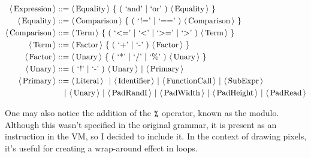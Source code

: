 \begin{align*}
        \langle\, \text{Expression}\, \rangle & ::= \langle\, \text{Equality}\, \rangle \ \{ \ ( \ \text{`and'} \ |\  \text{`or'} \ )\ \langle\, \text{Equality}\, \rangle \ \}                                 \\
        \langle\, \text{Equality}\, \rangle   & ::= \langle\, \text{Comparison}\, \rangle \ \{ \ ( \ \text{`!='} \ |\  \text{`=='} \ )\  \langle\, \text{Comparison}\, \rangle \ \}                             \\
        \langle\, \text{Comparison}\, \rangle & ::= \langle\, \text{Term}\, \rangle \ \{ \ ( \ \text{`<='} \ |\  \text{`<'} \ |\  \text{`>='} \ |\  \text{`>'} \ )\  \langle\, \text{Term}\, \rangle  \ \}      \\
        \langle\, \text{Term}\, \rangle       & ::= \langle\, \text{Factor}\, \rangle \ \{ \ ( \ \text{`+'} \ |\  \text{`-'} \ )\ \langle\, \text{Factor}\, \rangle \ \}                                        \\
        \langle\, \text{Factor}\, \rangle     & ::= \langle\, \text{Unary}\, \rangle \ \{ \ ( \ \text{`*'} \ |\  \text{`/'} \ |\ \text{`\%'} \ )\ \langle\, \text{Unary}\, \rangle \ \}                         \\
        \langle\, \text{Unary}\, \rangle      & ::=  ( \ \text{`!'} \ |\  \text{`-'} \ ) \ \langle\, \text{Unary}\, \rangle \ |\ \langle\, \text{Primary}\, \rangle                                             \\
        \langle\, \text{Primary}\, \rangle    & ::= \langle\, \text{Literal}\, \rangle \ \ |\
        \langle\, \text{Identifier}\, \rangle \ |\ \langle\, \text{FunctionCall}\, \rangle \ |\ \langle\, \text{SubExpr}\, \rangle
        \                                                                                                                                                    \\
                             & \quad | \ \langle\, \text{Unary}\, \rangle \ | \ \langle\, \text{PadRandI}\, \rangle \ | \ \langle\, \text{PadWidth}\, \rangle \ | \ \langle\, \text{PadHeight}\, \rangle \ | \ \langle\, \text{PadRead}\, \rangle
\end{align*}

One may also notice the addition of the $\texttt{\%}$ operator, known as the
modulo.  Although this wasn't specified in the original grammar, it is present
as an instruction in the VM, so I decided to include it. In the context of
drawing pixels, it's useful for creating a wrap-around effect in loops.

